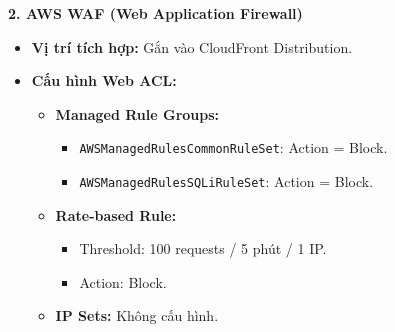 \documentclass[a4paper,12pt]{article}
\newcommand{\code}[1]{\texttt{#1}}
\begin{document}
\vspace{0.5cm}

\textbf{2. AWS WAF (Web Application Firewall)}
\begin{itemize}[leftmargin=*]
    \item \textbf{Vị trí tích hợp:} Gắn vào CloudFront Distribution.
    
    \item \textbf{Cấu hình Web ACL:}
    \begin{itemize}[label=--]
        \item \textbf{Managed Rule Groups:}
        \begin{itemize}[label=]
            \item \code{AWSManagedRulesCommonRuleSet}: Action = Block.
            \item \code{AWSManagedRulesSQLiRuleSet}: Action = Block.
        \end{itemize}
        
        \item \textbf{Rate-based Rule:}
        \begin{itemize}[label=]
            \item Threshold: 100 requests / 5 phút / 1 IP.
            \item Action: Block.
        \end{itemize}
        
        \item \textbf{IP Sets:} Không cấu hình.
    \end{itemize}
\end{itemize}
\end{document}
